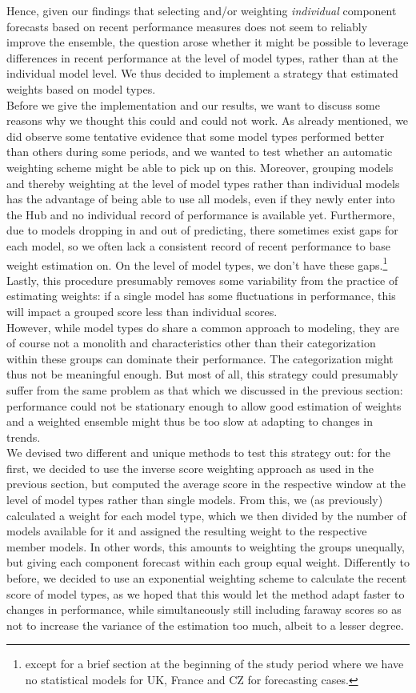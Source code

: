 Hence, given our findings that selecting and/or weighting \textit{individual} component forecasts based on recent performance measures does not seem to reliably improve the ensemble, the question arose whether it might be possible to leverage differences in recent performance at the level of model types, rather than at the individual model level. We thus decided to implement a strategy that estimated weights based on model types.\\
Before we give the implementation and our results, we want to discuss some reasons why we thought this could and could not work. As already mentioned, we did observe some tentative evidence that some model types performed better than others during some periods, and we wanted to test whether an automatic weighting scheme might be able to pick up on this. Moreover, grouping models and thereby weighting at the level of model types rather than individual models has the advantage of being able to use all models, even if they newly enter into the Hub and no individual record of performance is available yet. Furthermore, due to models dropping in and out of predicting, there sometimes exist gaps for each model, so we often lack a consistent record of recent performance to base weight estimation on. On the level of model types, we don't have these gaps.\footnote{except for a brief section at the beginning of the study period where we have no statistical models for UK, France and CZ for forecasting cases.} Lastly, this procedure presumably removes some variability from the practice of estimating weights: if a single model has some fluctuations in performance, this will impact a grouped score less than individual scores.\\
However, while model types do share a common approach to modeling, they are of course not a monolith and characteristics other than their categorization within these groups can dominate their performance. The categorization might thus not be meaningful enough. But most of all, this strategy could presumably suffer from the same problem as that which we discussed in the previous section: performance could not be stationary enough to allow good estimation of weights and a weighted ensemble might thus be too slow at adapting to changes in trends. \\
We devised two different and unique methods to test this strategy out: for the first, we decided to use the inverse score weighting approach as used in the previous section, but computed the average score in the respective window at the level of model types rather than single models. From this, we (as previously) calculated a weight for each model type, which we then divided by the number of models available for it and assigned the resulting weight to the respective member models. In other words, this amounts to weighting the groups unequally, but giving each component forecast within each group equal weight. Differently to before, we decided to use an exponential weighting scheme to calculate the recent score of model types, as we hoped that this would let the method adapt faster to changes in performance, while simultaneously still including faraway scores so as not to increase the variance of the estimation too much, albeit to a lesser degree.\\
